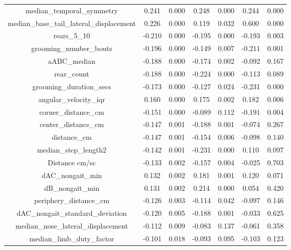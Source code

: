 \documentclass[11pt,reqno]{amsart}
\begin{document}
\begin{longtable}[c]{|c|c|c|c|c|c|c|}
median\_temporal\_symmetry                & 0.241    & 0.000   & 0.248  & 0.000   & 0.244   & 0.000  \\
median\_base\_tail\_lateral\_displacement & 0.226    & 0.000   & 0.119  & 0.032   & 0.600   & 0.000  \\
rears\_5\_10                              & -0.210   & 0.000   & -0.195 & 0.000   & -0.193  & 0.003  \\
grooming\_number\_bouts                   & -0.196   & 0.000   & -0.149 & 0.007   & -0.211  & 0.001  \\
aABC\_median                              & -0.188   & 0.000   & -0.174 & 0.002   & -0.092  & 0.167  \\
rear\_count                               & -0.188   & 0.000   & -0.224 & 0.000   & -0.113  & 0.089  \\
grooming\_duration\_secs                  & -0.173   & 0.000   & -0.127 & 0.024   & -0.231  & 0.000  \\
angular\_velocity\_iqr                    & 0.160    & 0.000   & 0.175  & 0.002   & 0.182   & 0.006  \\
corner\_distance\_cm                      & -0.151   & 0.000   & -0.089 & 0.112   & -0.191  & 0.004  \\
center\_distance\_cm                      & -0.147   & 0.001   & -0.188 & 0.001   & -0.074  & 0.267  \\
distance\_cm                              & -0.147   & 0.001   & -0.154 & 0.006   & -0.098  & 0.140  \\
median\_step\_length2                     & -0.142   & 0.001   & -0.231 & 0.000   & 0.110   & 0.097  \\
Distance cm/sc                            & -0.133   & 0.002   & -0.157 & 0.004   & -0.025  & 0.703  \\
dAC\_nongait\_min                         & 0.132    & 0.002   & 0.181  & 0.001   & 0.120   & 0.071  \\
dB\_nongait\_min                          & 0.131    & 0.002   & 0.214  & 0.000   & 0.054   & 0.420  \\
periphery\_distance\_cm                   & -0.126   & 0.003   & -0.114 & 0.042   & -0.097  & 0.146  \\
dAC\_nongait\_standard\_deviation         & -0.120   & 0.005   & -0.188 & 0.001   & -0.033  & 0.625  \\
median\_nose\_lateral\_displacement       & -0.112   & 0.009   & -0.083 & 0.137   & -0.061  & 0.358  \\
median\_limb\_duty\_factor                & -0.101   & 0.018   & -0.093 & 0.095   & -0.103  & 0.123  \\

\end{longtable}
\end{document}
